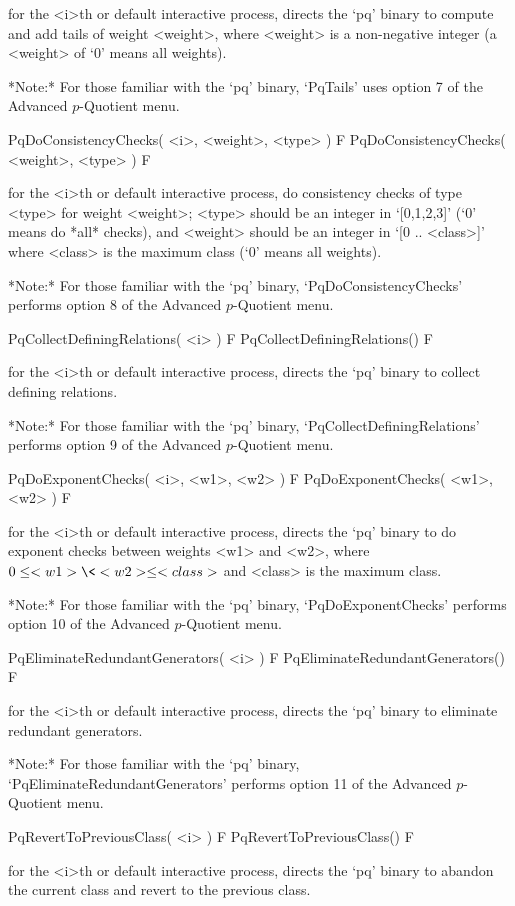 for the <i>th or default interactive {\ANUPQ} process, directs  the  `pq'
binary to compute and add tails of weight <weight>, where <weight>  is  a
non-negative integer (a <weight> of `0' means all weights).

*Note:*
For those familiar with the `pq' binary, `PqTails' uses option 7  of  the
Advanced $p$-Quotient menu.

\>PqDoConsistencyChecks( <i>, <weight>, <type> ) F
\>PqDoConsistencyChecks( <weight>, <type> ) F

for the <i>th or default interactive  {\ANUPQ}  process,  do  consistency
checks of type <type> for weight <weight>; <type> should be an integer in
`[0,1,2,3]' (`0' means do  *all*  checks),  and  <weight>  should  be  an
integer in `[0 .. <class>]' where <class> is the maximum class (`0' means
all weights).

*Note:*
For those familiar with the `pq' binary, `PqDoConsistencyChecks' performs
option 8 of the Advanced $p$-Quotient menu.

\>PqCollectDefiningRelations( <i> ) F
\>PqCollectDefiningRelations() F

for the <i>th or default interactive {\ANUPQ} process, directs  the  `pq'
binary to collect defining relations.

*Note:*
For those familiar with  the  `pq'  binary,  `PqCollectDefiningRelations'
performs option 9 of the Advanced $p$-Quotient menu.

\>PqDoExponentChecks( <i>, <w1>, <w2> ) F
\>PqDoExponentChecks( <w1>, <w2> ) F

for the <i>th or default interactive {\ANUPQ} process, directs  the  `pq'
binary to do exponent checks between weights <w1> and <w2>, where $0  \le
<w1> \< <w2> \le <class>$ and <class> is the maximum class.

*Note:*
For those familiar with the `pq'  binary,  `PqDoExponentChecks'  performs
option 10 of the Advanced $p$-Quotient menu.

\>PqEliminateRedundantGenerators( <i> ) F
\>PqEliminateRedundantGenerators() F

for the <i>th or default interactive {\ANUPQ} process, directs  the  `pq'
binary to eliminate redundant generators.

*Note:* 
For those familiar with the `pq' binary, `PqEliminateRedundantGenerators'
performs option 11 of the Advanced $p$-Quotient menu.

\>PqRevertToPreviousClass( <i> ) F
\>PqRevertToPreviousClass() F

for the <i>th or default interactive {\ANUPQ} process, directs  the  `pq'
binary to abandon the current class and revert to the previous class.


